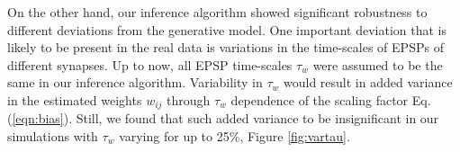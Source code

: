 %
%




On the other hand, our inference algorithm showed significant robustness to different deviations from the generative model.
One important deviation that is likely to be present in the real data is variations in the time-scales of EPSPs of different synapses. Up to now, all EPSP time-scales $\tau_w$ were assumed to be the same in our inference algorithm.
Variability in $\tau_w$ would result in added variance in the estimated weights $w_{ij}$ through $\tau_w$ dependence of the scaling factor Eq.(\ref{eqn:bias}).
Still, we found that such added variance to be insignificant in our simulations with $\tau_w$ varying for up to 25\%, Figure \ref{fig:vartau}.





